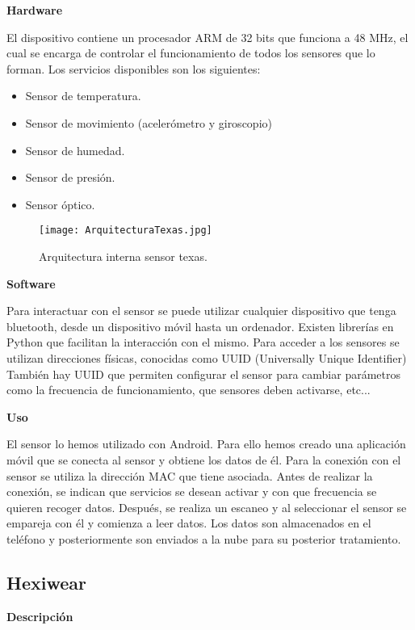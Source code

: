 \documentclass[11pt,spanish]{article}
\begin{document}
{\bf Hardware}
\newline

El dispositivo contiene un procesador ARM de 32 bits que funciona a 48 MHz, el cual se encarga de controlar el funcionamiento de todos los sensores que lo forman. Los servicios disponibles son los siguientes:

\begin{itemize}
  \item Sensor de temperatura.
  \item Sensor de movimiento (acelerómetro y giroscopio)
  \item Sensor de humedad.
  \item Sensor de presión.
  \item Sensor óptico.
\end{itemize}

\begin{figure}[h!]
  \centering
  \texttt{[image: ArquitecturaTexas.jpg]}
  \caption{Arquitectura interna sensor texas.}
\end{figure}

{\bf Software}
\newline

Para interactuar con el sensor se puede utilizar cualquier dispositivo que tenga bluetooth, desde un dispositivo móvil hasta un ordenador. Existen librerías en Python que facilitan la interacción con el mismo. Para acceder a los sensores se utilizan direcciones físicas, conocidas como UUID (Universally Unique Identifier) También hay UUID que permiten configurar el sensor para cambiar parámetros como la frecuencia de funcionamiento, que sensores deben activarse, etc...
\newline

{\bf Uso}
\newline

El sensor lo hemos utilizado con Android. Para ello hemos creado una aplicación móvil que se conecta al sensor y obtiene los datos de él. Para la conexión con el sensor se utiliza la dirección MAC que tiene asociada. Antes de realizar la conexión, se indican que servicios se desean activar y con que frecuencia se quieren recoger datos. Después, se realiza un escaneo y al seleccionar el sensor se empareja con él y comienza a leer datos. Los datos son almacenados en el teléfono y posteriormente son enviados a la nube para su posterior tratamiento.

\subsection{Hexiwear}
{\bf Descripción}
\newline
\end{document}
